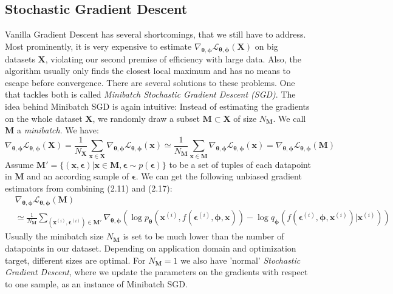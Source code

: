 \documentclass[12pt]{report}
\theoremstyle{definition}
\begin{document}
\subsection{Stochastic Gradient Descent}
Vanilla Gradient Descent has several shortcomings, that we still have to address. Most prominently, it is very expensive to estimate $\nabla_{\pmb{\theta}, \pmb{\phi}}\mathcal{L}_{\pmb{\theta}, \pmb{\phi}}(\mathbf{X})$ on big datasets $\mathbf{X}$, violating our second premise of efficiency with large data. Also, the algorithm usually only finds the closest local maximum and has no means to escape before convergence. There are several solutions to these problems. One that tackles both is called \emph{Minibatch Stochastic Gradient Descent (SGD)}.
The idea behind Minibatch SGD is again intuitive: Instead of estimating the gradients on the whole dataset $\mathbf{X}$, we randomly draw a subset $\mathbf{M} \subset \mathbf{X}$ of size $N_{\mathbf{M}}$. We call $\mathbf{M}$ a \emph{minibatch}. We have:
\begin{equation}
\nabla_{\pmb{\theta}, \pmb{\phi}}\mathcal{L}_{\pmb{\theta}, \pmb{\phi}}(\mathbf{X})
= \frac{1}{N_{\mathbf{X}}} \sum_{\mathbf{x} \in \mathbf{X}} \nabla_{\pmb{\theta}, \pmb{\phi}} \mathcal{L}_{\pmb{\theta}, \pmb{\phi}}(\mathbf{x})
\simeq \frac{1}{N_{\mathbf{M}}} \sum_{\mathbf{x} \in \mathbf{M}} \nabla_{\pmb{\theta}, \pmb{\phi}} \mathcal{L}_{\pmb{\theta}, \pmb{\phi}}(\mathbf{x})
= \nabla_{\pmb{\theta}, \pmb{\phi}}\mathcal{L}_{\pmb{\theta}, \pmb{\phi}}(\mathbf{M})
\end{equation}
Assume $\mathbf{M}'=\{(\mathbf{x}, \pmb{\epsilon}) |  \mathbf{x} \in \mathbf{M}, \pmb{\epsilon} \sim p(\pmb{\epsilon})\}$ to be a set of tuples of each datapoint in $\mathbf{M}$ and an according sample of $\pmb{\epsilon}$. We can get the following unbiased gradient estimators from combining (2.11) and (2.17):
\begin{equation}
\begin{split}
& \nabla_{\pmb{\theta}, \pmb{\phi}}\mathcal{L}_{\pmb{\theta}, \pmb{\phi}}(\mathbf{M}) \\
&	\simeq \frac{1}{N_{\mathbf{M}}} \sum_{(\mathbf{x}^{(i)}, \pmb{\epsilon}^{(i)}) \in \mathbf{M}'} \nabla_{\pmb{\theta}, \pmb{\phi}}(\log p_{\pmb{\theta}}(\mathbf{x}^{(i)}, f(\pmb{\epsilon}^{(i)}, \pmb{\phi}, \mathbf{x})) - \log q_{\pmb{\phi}}(f(\pmb{\epsilon}^{(i)}, \pmb{\phi}, \mathbf{x}^{(i)})|\mathbf{x}^{(i)}))
\end{split}
\end{equation}
Usually the minibatch size $N_{\mathbf{M}}$ is set to be much lower than the number of datapoints in our dataset. Depending on application domain and optimization target, different sizes are optimal. For $N_\mathbf{M}=1$ we also have 'normal' \emph{Stochastic Gradient Descent}, where we update the parameters on the gradients with respect to one sample, as an instance of Minibatch SGD. 
\end{document}
